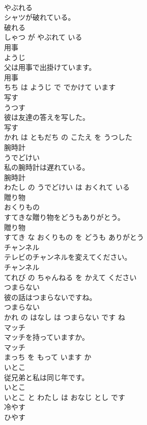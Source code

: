 \documentclass[8pt]{extreport}
\begin{document}
\begin{CJK}{UTF8}{min}
\\	やぶれる			
\\	シャツが破れている。	
\\	破れる 
\\	しゃつ が やぶれて いる			
\\	用事	
\\	ようじ			
\\	父は用事で出掛けています。	
\\	用事 
\\	ちち は ようじ で でかけて います			
\\	写す	
\\	うつす			
\\	彼は友達の答えを写した。	
\\	写す 
\\	かれ は ともだち の こたえ を うつした			
\\	腕時計	
\\	うでどけい			
\\	私の腕時計は遅れている。	
\\	腕時計 
\\	わたし の うでどけい は おくれて いる			
\\	贈り物	
\\	おくりもの			
\\	すてきな贈り物をどうもありがとう。	
\\	贈り物 
\\	すてき な おくりもの を どうも ありがとう			
\\	チャンネル	
\\	テレビのチャンネルを変えてください。	
\\	チャンネル 
\\	てれび の ちゃんねる を かえて ください			
\\	つまらない	
\\	彼の話はつまらないですね。	
\\	つまらない 
\\	かれ の はなし は つまらない です ね			
\\	マッチ	
\\	マッチを持っていますか。	
\\	マッチ 
\\	まっち を もって います か			
\\	いとこ	
\\	従兄弟と私は同じ年です。	
\\	いとこ 
\\	いとこ と わたし は おなじ とし です			
\\	冷やす	
\\	ひやす			

\end{CJK}
\end{document}
